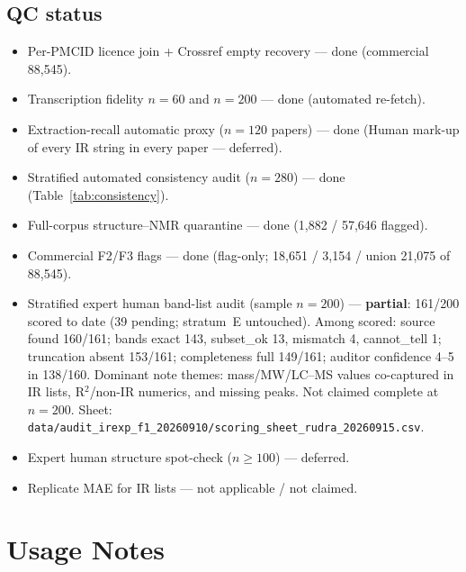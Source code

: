 \documentclass[pdflatex,sn-nature]{sn-jnl}
\begin{document}
\subsection{QC status}

\begin{itemize}
  \item Per-PMCID licence join + Crossref empty recovery --- done
        (commercial 88,545).
  \item Transcription fidelity $n=60$ and $n=200$ --- done (automated re-fetch).
  \item Extraction-recall automatic proxy ($n=120$ papers) --- done
        (Human mark-up of every IR string in every paper --- deferred).
  \item Stratified automated consistency audit ($n=280$) --- done
        (Table~\ref{tab:consistency}).
  \item Full-corpus structure--NMR quarantine --- done
        (1,882 / 57,646 flagged).
  \item Commercial F2/F3 flags --- done (flag-only; 18,651 / 3,154 / union 21,075
        of 88,545).
  \item Stratified expert human band-list audit (sample $n=200$) ---
        \textbf{partial}: 161/200 scored to date (39 pending; stratum~E
        untouched). Among scored: source found 160/161; bands exact 143,
        subset\_ok 13, mismatch 4, cannot\_tell 1; truncation absent 153/161;
        completeness full 149/161; auditor confidence 4--5 in 138/160.
        Dominant note themes: mass/MW/LC--MS values co-captured in IR lists,
        R$^{2}$/non-IR numerics, and missing peaks. Not claimed complete at
        $n=200$. Sheet:
        \texttt{data/audit\_irexp\_f1\_20260910/scoring\_sheet\_rudra\_20260915.csv}.
  \item Expert human structure spot-check ($n\geq 100$) --- deferred.
  \item Replicate MAE for IR lists --- not applicable / not claimed.
\end{itemize}

\section{Usage Notes}\label{sec:usage}
\end{document}
